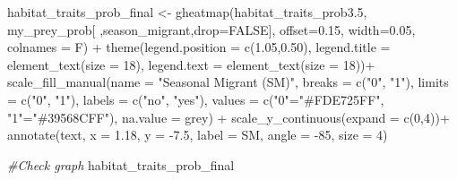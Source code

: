 \documentclass[
]{article}
\newenvironment{Shaded}{\begin{snugshade}}{\end{snugshade}}
\newcommand{\AttributeTok}[1]{\textcolor[rgb]{0.77,0.63,0.00}{#1}}
\newcommand{\CommentTok}[1]{\textcolor[rgb]{0.56,0.35,0.01}{\textit{#1}}}
\newcommand{\ConstantTok}[1]{\textcolor[rgb]{0.00,0.00,0.00}{#1}}
\newcommand{\DecValTok}[1]{\textcolor[rgb]{0.00,0.00,0.81}{#1}}
\newcommand{\FloatTok}[1]{\textcolor[rgb]{0.00,0.00,0.81}{#1}}
\newcommand{\FunctionTok}[1]{\textcolor[rgb]{0.00,0.00,0.00}{#1}}
\newcommand{\NormalTok}[1]{#1}
\newcommand{\OtherTok}[1]{\textcolor[rgb]{0.56,0.35,0.01}{#1}}
\newcommand{\SpecialCharTok}[1]{\textcolor[rgb]{0.00,0.00,0.00}{#1}}
\newcommand{\StringTok}[1]{\textcolor[rgb]{0.31,0.60,0.02}{#1}}
\begin{document}
\begin{Shaded}
\begin{Highlighting}[]
\NormalTok{habitat\_traits\_prob\_final }\OtherTok{\textless{}{-}} \FunctionTok{gheatmap}\NormalTok{(habitat\_traits\_prob3}\FloatTok{.5}\NormalTok{, }
\NormalTok{                                      my\_prey\_prob[ ,}\StringTok{\textquotesingle{}season\_migrant\textquotesingle{}}\NormalTok{,}\AttributeTok{drop=}\ConstantTok{FALSE}\NormalTok{],}
                                     \AttributeTok{offset=}\FloatTok{0.15}\NormalTok{, }\AttributeTok{width=}\FloatTok{0.05}\NormalTok{, }\AttributeTok{colnames =}\NormalTok{ F) }\SpecialCharTok{+}
  \FunctionTok{theme}\NormalTok{(}\AttributeTok{legend.position =} \FunctionTok{c}\NormalTok{(}\FloatTok{1.05}\NormalTok{,}\FloatTok{0.50}\NormalTok{),}
        \AttributeTok{legend.title =} \FunctionTok{element\_text}\NormalTok{(}\AttributeTok{size =} \DecValTok{18}\NormalTok{), }
        \AttributeTok{legend.text =} \FunctionTok{element\_text}\NormalTok{(}\AttributeTok{size =} \DecValTok{18}\NormalTok{))}\SpecialCharTok{+}
  \FunctionTok{scale\_fill\_manual}\NormalTok{(}\AttributeTok{name =} \StringTok{"Seasonal Migrant (SM)"}\NormalTok{,}
                    \AttributeTok{breaks =} \FunctionTok{c}\NormalTok{(}\StringTok{"0"}\NormalTok{, }\StringTok{"1"}\NormalTok{),}
                    \AttributeTok{limits =} \FunctionTok{c}\NormalTok{(}\StringTok{"0"}\NormalTok{, }\StringTok{"1"}\NormalTok{),}
                    \AttributeTok{labels =} \FunctionTok{c}\NormalTok{(}\StringTok{"no"}\NormalTok{, }\StringTok{"yes"}\NormalTok{),}
                    \AttributeTok{values =} \FunctionTok{c}\NormalTok{(}\StringTok{"0"}\OtherTok{=}\StringTok{"\#FDE725FF"}\NormalTok{, }\StringTok{"1"}\OtherTok{=}\StringTok{"\#39568CFF"}\NormalTok{), }
                    \AttributeTok{na.value =} \StringTok{\textquotesingle{}grey\textquotesingle{}}\NormalTok{) }\SpecialCharTok{+}
  \FunctionTok{scale\_y\_continuous}\NormalTok{(}\AttributeTok{expand =} \FunctionTok{c}\NormalTok{(}\DecValTok{0}\NormalTok{,}\DecValTok{4}\NormalTok{))}\SpecialCharTok{+}
  \FunctionTok{annotate}\NormalTok{(}\StringTok{\textquotesingle{}text\textquotesingle{}}\NormalTok{, }\AttributeTok{x =} \FloatTok{1.18}\NormalTok{, }\AttributeTok{y =} \SpecialCharTok{{-}}\FloatTok{7.5}\NormalTok{, }\AttributeTok{label =} \StringTok{\textquotesingle{}SM\textquotesingle{}}\NormalTok{, }\AttributeTok{angle =} \SpecialCharTok{{-}}\DecValTok{85}\NormalTok{, }\AttributeTok{size =} \DecValTok{4}\NormalTok{)}

  
\CommentTok{\#Check graph}
\NormalTok{habitat\_traits\_prob\_final}
\end{Highlighting}
\end{Shaded}
\end{document}
